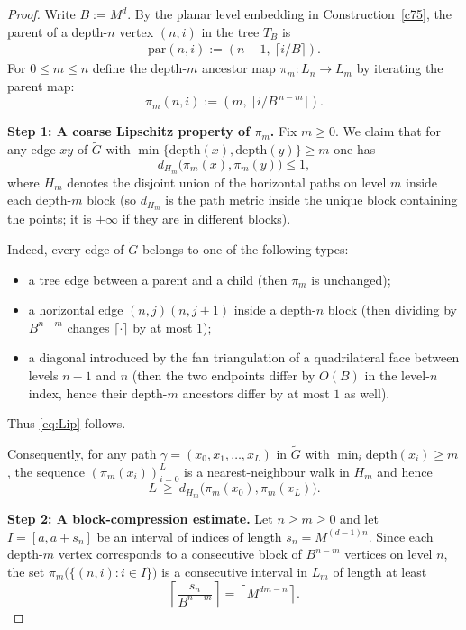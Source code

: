 \documentclass[11pt]{amsart}
\theoremstyle{plain}
\numberwithin{equation}{section}
\numberwithin{figure}{section}
\begin{document}
\begin{proof}
Write $B:=M^d$.
By the planar level embedding in Construction~\ref{c75}, the parent of a depth-$n$ vertex
$(n,i)$ in the tree $T_B$ is
\begin{align*}
\mathrm{par}(n,i):=(n-1,\ \lceil i/B\rceil).
\end{align*}
For $0\le m\le n$ define the depth-$m$ ancestor map $\pi_m:L_n\to L_m$ by iterating the parent map:
\[
\pi_m(n,i):=(m,\ \lceil i/B^{\,n-m}\rceil).
\]

\smallskip
\noindent\textbf{Step 1: A coarse Lipschitz property of $\pi_m$.}
Fix $m\ge0$. We claim that for any edge $xy$ of $\widetilde G$ with
$\min\{\mathrm{depth}(x),\mathrm{depth}(y)\}\ge m$ one has
\begin{equation}\label{eq:Lip}
d_{H_m}\bigl(\pi_m(x),\pi_m(y)\bigr)\le 1,
\end{equation}
where $H_m$ denotes the disjoint union of the horizontal paths on level $m$ inside each
depth-$m$ block (so $d_{H_m}$ is the path metric inside the unique block containing the
points; it is $+\infty$ if they are in different blocks).

Indeed, every edge of $\widetilde G$ belongs to one of the following types:
\begin{itemize}
\item a tree edge between a parent and a child (then $\pi_m$ is unchanged);
\item a horizontal edge $(n,j)(n,j+1)$ inside a depth-$n$ block (then dividing by $B^{n-m}$
changes $\lceil\cdot\rceil$ by at most $1$);
\item a diagonal introduced by the fan triangulation of a quadrilateral face between
levels $n-1$ and $n$ (then the two endpoints differ by $O(B)$ in the level-$n$ index,
hence their depth-$m$ ancestors differ by at most $1$ as well).
\end{itemize}
Thus \eqref{eq:Lip} follows.

Consequently, for any path $\gamma=(x_0,x_1,\dots,x_L)$ in $\widetilde G$ with
$\min_i \mathrm{depth}(x_i)\ge m$,
the sequence $(\pi_m(x_i))_{i=0}^L$ is a nearest-neighbour walk in $H_m$ and hence
\begin{equation}\label{eq:pathproj}
L\ \ge\ d_{H_m}\bigl(\pi_m(x_0),\pi_m(x_L)\bigr).
\end{equation}

\smallskip
\noindent\textbf{Step 2: A block-compression estimate.}
Let $n\ge m\ge0$ and let $I=[a,a+s_n]$ be an interval of indices of length $s_n=M^{(d-1)n}$.
Since each depth-$m$ vertex corresponds to a consecutive block of $B^{n-m}$ vertices on level $n$,
the set $\pi_m\bigl(\{(n,i):i\in I\}\bigr)$ is a consecutive interval in $L_m$ of length at least
\begin{equation}\label{eq:compress}
\left\lceil \frac{s_n}{B^{n-m}}\right\rceil
=\left\lceil M^{dm-n}\right\rceil.
\end{equation}


\end{proof}
\end{document}
